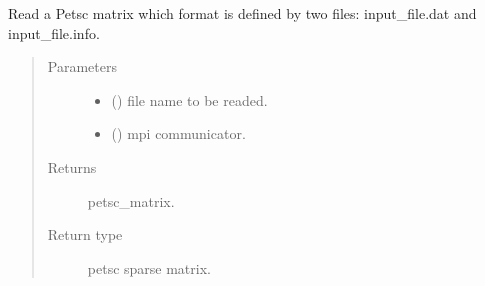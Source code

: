 \documentclass[letterpaper,10pt,english]{sphinxmanual}
\begin{document}

\begin{fulllineitems}
\label{\detokenize{petgem/parallel:petgem.parallel.readPetscMatrix}}
Read a Petsc matrix which format is defined by two files: input\_file.dat and input\_file.info.
\begin{quote}\begin{description}
\item[{Parameters}] \leavevmode\begin{itemize}
\item {} 
 () \textendash{} file name to be readed.

\item {} 
 () \textendash{} mpi communicator.

\end{itemize}

\item[{Returns}] \leavevmode
petsc\_matrix.

\item[{Return type}] \leavevmode
petsc sparse matrix.

\end{description}\end{quote}

\end{fulllineitems}

\end{document}
